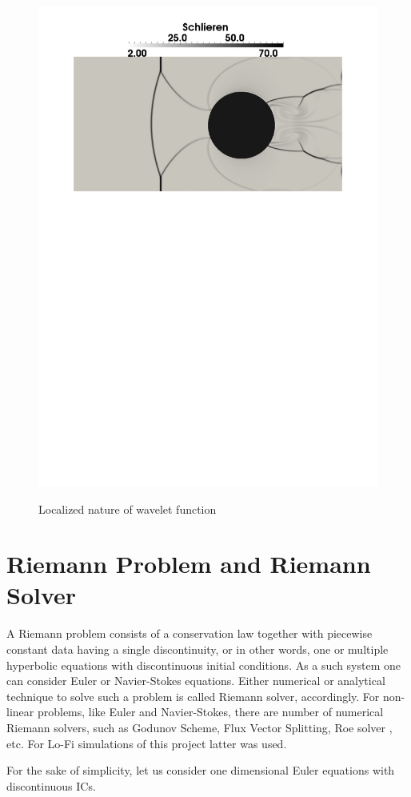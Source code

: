 \begin{figure}[h!]
\begin{minipage}{0.5\linewidth}
\includegraphics[scale=0.4]{fig/visc_sch.pdf}\\
\end{minipage}
\caption{Localized nature of wavelet function} \label{fig:visc}
\end{figure}

\section{Riemann Problem and Riemann Solver}
A Riemann problem consists of a conservation law together with piecewise constant data having a single discontinuity, or in other words, one or multiple hyperbolic equations with discontinuous initial conditions. As a such system one can consider Euler or Navier-Stokes equations. Either numerical or analytical technique to solve such a problem is called Riemann solver, accordingly. For non-linear problems, like Euler and Navier-Stokes, there are number of numerical Riemann solvers, such as Godunov Scheme, Flux Vector Splitting, Roe solver \cite{book:Toro}, etc. For Lo-Fi simulations of this project latter was used.

For the sake of simplicity, let us consider one dimensional Euler equations with discontinuous ICs.




